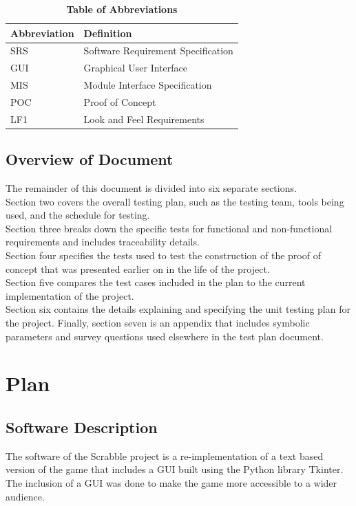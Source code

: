 \documentclass[12pt, titlepage]{article}
\begin{document}
\begin{table}[hbp]
\caption{\textbf{Table of Abbreviations}} \label{Table}

\begin{tabularx}{\textwidth}{p{3cm}X}
\toprule
\textbf{Abbreviation} & \textbf{Definition} \\
\midrule
SRS & Software Requirement Specification\\
GUI & Graphical User Interface\\
MIS & Module Interface Specification\\
POC & Proof of Concept \\
LF1 & Look and Feel Requirements\\
\bottomrule
\end{tabularx}

\end{table}

\subsection{Overview of Document}
The remainder of this document is divided into six separate sections. \\
Section two covers the overall testing plan, such as the testing team, tools being used, and the schedule for testing.\\ 
Section three breaks down the specific tests for functional and non-functional requirements and includes traceability details.\\
Section four specifies the tests used to test the construction of the proof of concept that was presented earlier on in the life of the project.\\
Section five compares the test cases included in the plan to the current implementation of the project.\\
Section six contains the details explaining and specifying the unit testing plan for the project.
Finally, section seven is an appendix that includes symbolic parameters and survey questions used elsewhere in the test plan document.

\section{Plan} 
	
\subsection{Software Description}
The software of the Scrabble project is a re-implementation of a text based version of the game that includes a GUI built using the Python library Tkinter. The inclusion of a GUI was done to make the game more accessible to a wider audience.
\end{document}
